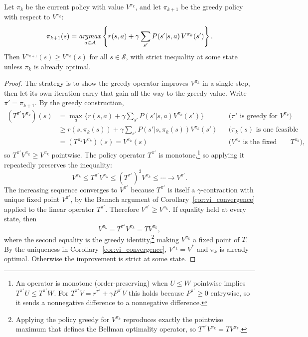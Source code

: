 \begin{theorem}
\label{thm:policy_improvement}
Let $\pi_k$ be the current policy with value $V^{\pi_k}$, and let $\pi_{k+1}$ be the greedy policy with respect to $V^{\pi_k}$:
\begin{equation}
\pi_{k+1}(s) = \mathop{\it argmax}_{a \in \mathcal{A}} \left\{ r(s,a) + \gamma \sum_{s'} P(s'|s,a)\, V^{\pi_k}(s') \right\}.
\end{equation}
Then $V^{\pi_{k+1}}(s) \geq V^{\pi_k}(s)$ for all $s \in \mathcal{S}$, with strict inequality at some state unless $\pi_k$ is already optimal.
\end{theorem}

\begin{proof}
The strategy is to show the greedy operator improves $V^{\pi_k}$ in a single step, then let its own iteration carry that gain all the way to the greedy value. Write $\pi' = \pi_{k+1}$. By the greedy construction,
\begin{align*}
(T^{\pi'} V^{\pi_k})(s)
  &= \max_{a} \Big\{ r(s,a) + \gamma \sum_{s'} P(s'|s,a) V^{\pi_k}(s') \Big\}
    && \text{($\pi'$ is greedy for $V^{\pi_k}$)} \\
  &\geq r(s,\pi_k(s)) + \gamma \sum_{s'} P(s'|s,\pi_k(s)) V^{\pi_k}(s')
    && \text{($\pi_k(s)$ is one feasible action)} \\
  &= (T^{\pi_k} V^{\pi_k})(s) = V^{\pi_k}(s)
    && \text{($V^{\pi_k}$ is the fixed point of $T^{\pi_k}$),}
\end{align*}
so $T^{\pi'} V^{\pi_k} \geq V^{\pi_k}$ pointwise. The policy operator $T^{\pi'}$ is monotone,\footnote{An operator is monotone (order-preserving) when $U \leq W$ pointwise implies $T^{\pi'} U \leq T^{\pi'} W$. For $T^{\pi'} V = r^{\pi'} + \gamma P^{\pi'} V$ this holds because $P^{\pi'} \geq 0$ entrywise, so it sends a nonnegative difference to a nonnegative difference.} so applying it repeatedly preserves the inequality:
\[
V^{\pi_k} \leq T^{\pi'} V^{\pi_k} \leq (T^{\pi'})^2 V^{\pi_k} \leq \cdots \longrightarrow V^{\pi'} .
\]
The increasing sequence converges to $V^{\pi'}$ because $T^{\pi'}$ is itself a $\gamma$-contraction with unique fixed point $V^{\pi'}$, by the Banach argument of Corollary~\ref{cor:vi_convergence} applied to the linear operator $T^{\pi'}$. Therefore $V^{\pi'} \geq V^{\pi_k}$. If equality held at every state, then
\[
V^{\pi_k} = T^{\pi'} V^{\pi_k} = T V^{\pi_k},
\]
where the second equality is the greedy identity,\footnote{Applying the policy greedy for $V^{\pi_k}$ reproduces exactly the pointwise maximum that defines the Bellman optimality operator, so $T^{\pi'} V^{\pi_k} = T V^{\pi_k}$.} making $V^{\pi_k}$ a fixed point of $T$. By the uniqueness in Corollary~\ref{cor:vi_convergence}, $V^{\pi_k} = V^*$ and $\pi_k$ is already optimal. Otherwise the improvement is strict at some state.
\end{proof}

